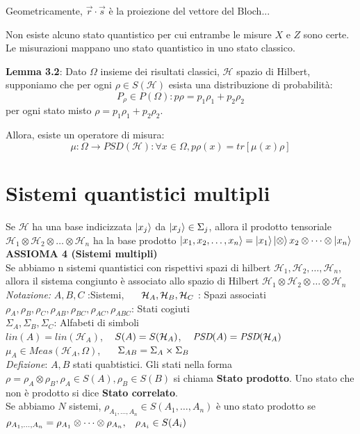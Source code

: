 \documentclass{report}
\begin{document}
Geometricamente, $\vec{r}\cdot\vec{s}$ è la proiezione del vettore del Bloch...

Non esiste alcuno stato quantistico per cui entrambe le misure $X$ e $Z$ sono certe. Le misurazioni mappano uno stato quantistico in uno stato classico.

\textbf{Lemma 3.2}: Dato $\Omega$ insieme dei risultati classici, $\mathcal{H}$ spazio di Hilbert, supponiamo che per ogni $\rho\in S(\mathcal{H})$ esista una distribuzione di probabilità:
$$P_\rho\in P(\Omega): p\rho =p_1\rho_1+p_2\rho_2$$ per ogni stato misto
$\rho = p_1\rho_1+p_2\rho_2$. 

Allora, esiste un operatore di misura: $$\mu:\Omega\rightarrow\textit{PSD}(\mathcal{H}):\forall x\in\Omega, p\rho(x)=\textit{tr}[\mu(x)\rho]$$

\newpage
\section{Sistemi quantistici multipli}
Se $\mathcal{H}$ ha una base indicizzata $\ket{x_j}$ da $\ket{x_j}\in \Sigma_j$, allora il prodotto tensoriale $\mathcal{H}_1\otimes\mathcal{H}_2\otimes\dots\otimes\mathcal{H}_n$ ha la base prodotto $\ket{x_1,x_2,\dots,x_n}=\ket{x_1}\ket\otimes{x_2}\otimes\dots\otimes\ket{x_n}$
\medskip
\\ \textbf{ASSIOMA 4 (Sistemi multipli)}
\\Se abbiamo n sistemi quantistici con rispettivi spazi di hilbert $\mathcal{H}_1,\mathcal{H}_2,\dots,\mathcal{H}_n$, allora il sistema congiunto è associato allo spazio di Hilbert $\mathcal{H}_1\otimes\mathcal{H}_2\otimes\dots\otimes\mathcal{H}_n$
\medskip
\\ \textit{Notazione:} $A,B,C $ :Sistemi, $\hspace{0.5cm}\mathcal{H}_A,\mathcal{H}_B,\mathcal{H}_C$ : Spazi associati
\medskip
\\ $\rho_A,\rho_B,\rho_C,\rho_{AB},\rho_{BC},\rho_{AC},\rho_{ABC}$: Stati cogiuti
\medskip
\\$\Sigma_A,\Sigma_B,\Sigma_C$: Alfabeti di simboli
\medskip
\\ $\textit{lin}(A)= \textit{lin}(\mathcal{H}_A)$, $\hspace{0.3cm}S(A) = S(\mathcal{H}_A)$, $\hspace{0.3cm}\textit{PSD}(A)= \textit{PSD}(\mathcal{H}_A)$
\medskip
\\ $\mu_A\in\textit{Meas}(\mathcal{H}_A,\Omega)$, $\hspace{0.5cm}\Sigma_{AB}= \Sigma_A\times\Sigma_B$
\medskip
\\ \textit{Defizione}: $A,B$ stati quabtistici. Gli stati  nella forma $\rho=\rho_A\otimes\rho_B,\rho_A\in S(A),\rho_B\in S(B)$ si chiama \textbf{Stato prodotto}. Uno stato che non è prodotto si dice \textbf{Stato correlato}.
\\Se abbiamo $N$ sistemi, $\rho_{A_1,\dots,A_n}\in S(A_1,\dots,A_n)$ è uno stato prodotto se $\rho_{A_1,\dots,A_n}=\rho_{A_1}\otimes\dots\otimes\rho_{A_n},\hspace{0.3cm}\rho_{A_i}\in S(A_i)$
\end{document}
